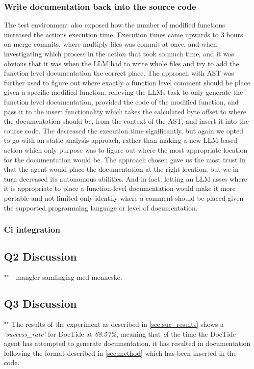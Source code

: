 \subsubsection*{Write documentation back into the source code}
The test environment also exposed how the number of modified functions increased the actions execution time.
Execution times came upwards to 3 hours on merge commits, where multiply files was commit at once, and when investigating which process in the action that took so much time, and it was obvious that it was when the LLM had to write whole files and try to add the function level documentation the correct place. The approach with AST was further used to figure out where exactly a function level comment should be place given a specific modified function, relieving the LLMs task to only generate the function level documentation, provided the code of the modified function, and pass it to the insert functionality which takes the calculated byte offset to where the documentation should be, from the context of the AST, and insert it into the source code. The decreased the execution time significantly, but again we opted to go with an static analysis approach, rather than making a new LLM-based action which only purpose was to figure out where the most appropriate location for the documentation would be. The approach chosen gave us the most trust in that the agent would place the documentation at the right location, but we in turn decreased its autonomous abilities. And in fact, letting an LLM asses where it is appropriate to place a function-level documentation would make it more portable and not limited only identify where a comment should be placed given the supported programming language or level of documentation.
\subsubsection*{Ci integration}


\subsection{Q2 Discussion}
\label{sec:DiscussionQ2}
"\textit{\subquestionII}"
- mangler samlinging med menneske.


\subsection{Q3 Discussion}
\label{sec:DiscussionQ3}
"\textit{\subquestionIII}"
The results of the experiment as described in \cref{sec:suc_results} shows a \textit{'success\_rate'} for DocTide at \textit{68.57\%}, meaning that \textit of the time the DocTide agent has attempted to generate documentation, it has resulted in documentation following the format described in \cref{sec:method} which has been inserted in the code. 
